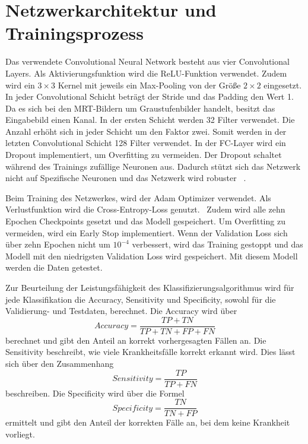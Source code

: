 \section{Netzwerkarchitektur und Trainingsprozess}

Das verwendete Convolutional Neural Network besteht aus vier Convolutional Layers. Als Aktivierungsfunktion wird die ReLU-Funktion verwendet.
Zudem wird ein $3 \times 3$ Kernel mit jeweils ein Max-Pooling von der Größe $2 \times 2$ eingesetzt. 
In jeder Convolutional Schicht beträgt der Stride und das Padding den Wert 1.
Da es sich bei den MRT-Bildern um Graustufenbilder handelt, besitzt das Eingabebild einen Kanal. 
In der ersten Schicht werden 32 Filter verwendet.
Die Anzahl erhöht sich in jeder Schicht um den Faktor zwei.
Somit werden in der letzten Convolutional Schicht 128 Filter verwendet.
In der FC-Layer wird ein Dropout implementiert, um Overfitting zu vermeiden.
Der Dropout schaltet während des Trainings zufällige Neuronen aus.
Dadurch stützt sich das Netzwerk nicht auf Spezifische Neuronen und das Netzwerk wird robuster ~\cite{Yamashita2018}.

Beim Training des Netzwerkes, wird der Adam Optimizer verwendet. 
Als Verlustfunktion wird die Cross-Entropy-Loss genutzt.~\cite{pytorchCrossEntropy}
Zudem wird alle zehn Epochen Checkpoints gesetzt und das Modell gespeichert.
Um Overfitting zu vermeiden, wird ein Early Stop implementiert. Wenn der Validation Loss sich über zehn Epochen nicht um $10^{-4}$
verbessert, wird das Training gestoppt und das Modell mit den niedrigsten Validation Loss wird gespeichert.
Mit diesem Modell werden die Daten getestet.

Zur Beurteilung der Leistungsfähigkeit des Klassifizierungsalgorithmus wird für jede Klassifikation die Accuracy, 
Sensitivity und Specificity, sowohl für die Validierung- und Testdaten, berechnet.
Die Accuracy wird über
\begin{equation}
  Accuracy = \frac{TP + TN}{TP + TN + FP + FN}
\end{equation}
berechnet und gibt den Anteil an korrekt vorhergesagten Fällen an. 
Die Sensitivity beschreibt, wie viele Krankheitsfälle korrekt erkannt wird. 
Dies lässt sich über den Zusammenhang
\begin{equation}
  Sensitivity = \frac{TP}{TP + FN}
\end{equation}
beschreiben.
Die Specificity wird über die Formel
\begin{equation}
  Specificity = \frac{TN}{TN + FP}
\end{equation}
ermittelt und gibt den Anteil der korrekten Fälle an, bei dem keine Krankheit vorliegt.%

